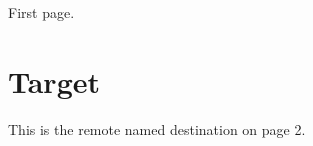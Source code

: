 \documentclass{article}
\begin{document}
First page.
\newpage
\section{Target}
This is the remote named destination on page 2.
\end{document}
